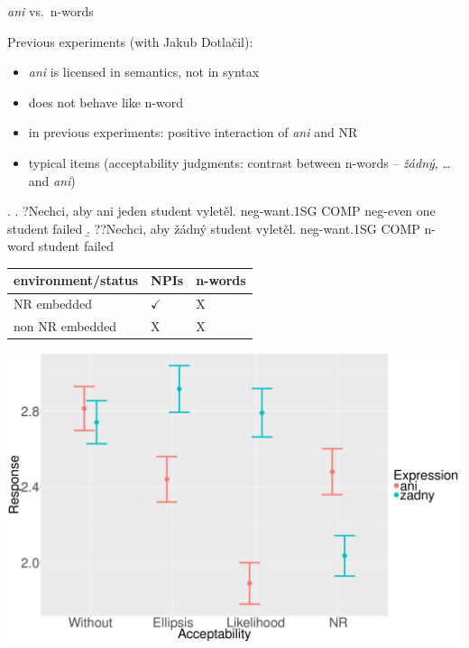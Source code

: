 \documentclass[ignorenonframetext,]{beamer}
\providecommand{\tightlist}{%
  \setlength{\itemsep}{0pt}\setlength{\parskip}{0pt}}
\begin{document}
\begin{frame}{\emph{ani} vs.~n-words}

Previous experiments (with Jakub Dotlačil):

\begin{itemize}
\tightlist
\item
  \emph{ani} is licensed in semantics, not in syntax
\item
  does not behave like n-word
\item
  in previous experiments: positive interaction of \emph{ani} and NR
\item
  typical items (acceptability judgments: contrast between n-words --
  \emph{žádný}, \ldots{} and \emph{ani})
\end{itemize}

\ex. \a. ?Nechci, aby ani jeden student vyletěl.\newline
 neg-want.1SG COMP neg-even one student failed \b. ??Nechci, aby žádný
student vyletěl.\newline
 neg-want.1SG COMP n-word student failed

\end{frame}

\begin{frame}

\begin{longtable}[]{@{}lll@{}}
\toprule
environment/status & NPIs & n-words\tabularnewline
\midrule
\endhead
NR embedded & \(\checkmark\) & X\tabularnewline
non NR embedded & X & X\tabularnewline
\bottomrule
\end{longtable}

\end{frame}

\begin{frame}

\begin{center}
\includegraphics[scale=0.23]{mean-sum.png}
\end{center}

\end{frame}
\end{document}
